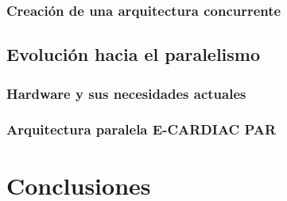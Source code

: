 \documentclass[letterpaper,12pt,oneside]{book}
\begin{document}
		\subsection{Creación de una arquitectura concurrente}
	
	 \section{Evolución hacia el paralelismo}
	 
	 	\subsection{Hardware y sus necesidades actuales}
	 	
	 	
	 	\subsection{Arquitectura paralela E-CARDIAC PAR}


\chapter{Conclusiones}

\newpage

	
	

\end{document}
